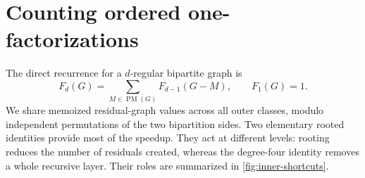 \documentclass[11pt]{article}
\theoremstyle{definition}
\theoremstyle{remark}
\newcommand{\PM}{\mathop{\mathrm{PM}}}
\begin{document}
\section{Counting ordered one-factorizations}
\label{sec:factor}

The direct recurrence for a $d$-regular bipartite graph is
\begin{equation}
  F_d(G)=\sum_{M\in\PM(G)}F_{d-1}(G-M),
  \qquad F_1(G)=1.
  \label{eq:plainrec}
\end{equation}
We share memoized residual-graph values across all outer classes, modulo
independent permutations of the two bipartition sides.  Two elementary rooted
identities provide most of the speedup.  They act at different levels:
rooting reduces the number of residuals created, whereas the degree-four
identity removes a whole recursive layer.  Their roles are summarized in
\cref{fig:inner-shortcuts}.
\end{document}
